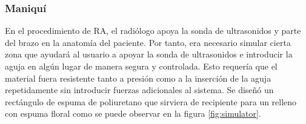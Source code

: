 \subsubsection{Maniquí} 
En el procedimiento de \ac{RA}, el radiólogo apoya la sonda de ultrasonidos y parte del brazo en la anatomía del paciente. Por tanto, era necesario simular cierta zona que ayudará al usuario a apoyar la sonda de ultrasonidos e introducir la aguja en algún lugar de manera segura y controlada. Esto requería que el material fuera resistente tanto a presión como a la inserción de la aguja repetidamente sin introducir fuerzas adicionales al sistema. Se diseñó un rectángulo de espuma de poliuretano que sirviera de recipiente para un relleno con espuma floral como se puede observar en la figura \ref{fig:simulator}.






